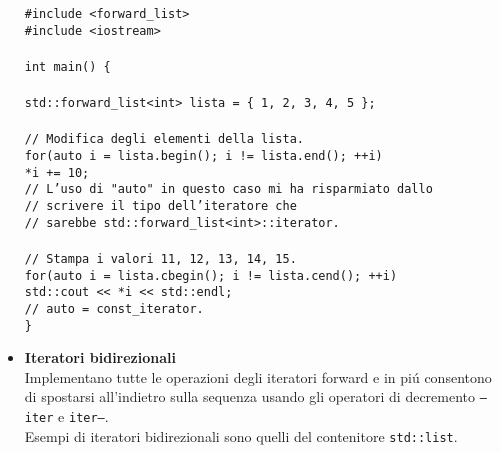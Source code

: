 \documentclass{article}
\newcommand\tab[1][1cm]{\hspace*{#1}}
\begin{document}
\begin{itemize}
\texttt{\#include <forward\_list>\\ \#include <iostream> \\ \\ int main() \{ \\ \\ \tab std::forward\_list<int> lista = \{ 1, 2, 3, 4, 5 \}; \\ \\ \tab \textcolor{grigio}{// Modifica degli elementi della lista.}\\ \tab for(auto i = lista.begin(); i != lista.end(); ++i) \\ \tab \tab *i += 10; \\ \tab \textcolor{grigio}{// L'uso di "auto" in questo caso mi ha risparmiato dallo \\ \tab // scrivere il tipo dell'iteratore che \\ \tab // sarebbe std::forward\_list<int>::iterator. \\ \\ \tab // Stampa i valori 11, 12, 13, 14, 15. }\\ \tab for(auto i = lista.cbegin(); i != lista.cend(); ++i) \\ \tab \tab std::cout << *i << std::endl; \\ \tab \textcolor{grigio}{// auto = const\_iterator. }\\ \} } \\
\item \textbf{\textcolor{blu}{Iteratori bidirezionali}}\\Implementano tutte le operazioni degli iteratori forward e in pi\'u consentono di spostarsi all'indietro sulla sequenza usando gli operatori di decremento \texttt{--iter} e \texttt{iter--}.\\Esempi di iteratori bidirezionali sono quelli del contenitore \texttt{std::list}. \\ \\

\end{itemize}
\end{document}
